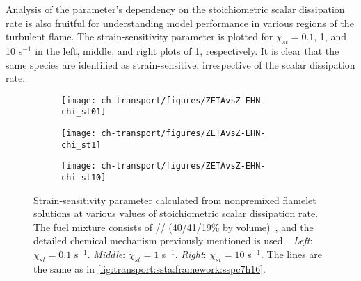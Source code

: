 Analysis of the parameter's dependency on the stoichiometric scalar dissipation rate is also fruitful for understanding model performance in various regions of the turbulent flame. The strain-sensitivity parameter is plotted for $\chi_{st} = 0.1$, 1, and 10 s$^{-1}$ in the left, middle, and right plots of \cref{fig:transport:ssta:dependencies:chist}, respectively. It is clear that the same species are identified as strain-sensitive, irrespective of the scalar dissipation rate.


\begin{figure}[ht]
  \centering
  \begin{subfigure}[b]{0.33\linewidth}
    \texttt{[image: ch-transport/figures/ZETAvsZ-EHN-chi\_st01]}
  \end{subfigure}%
  \begin{subfigure}[b]{0.33\linewidth}
    \texttt{[image: ch-transport/figures/ZETAvsZ-EHN-chi\_st1]}
  \end{subfigure}%
  \begin{subfigure}[b]{0.33\linewidth}
    \texttt{[image: ch-transport/figures/ZETAvsZ-EHN-chi\_st10]}
  \end{subfigure}
  \caption[Dependency of Strain-Sensitivity Parameter \texorpdfstring{$\zeta_k$}{Zk} on \texorpdfstring{$\chi_{st}$}{Xst}]{Strain-sensitivity parameter calculated from nonpremixed flamelet solutions at various values of stoichiometric scalar dissipation rate. The fuel mixture consists of // (40/41/19\% by volume)~\cite{mahmoud2017}, and the detailed chemical mechanism previously mentioned is used~\cite{blanquart2009588,narayanaswamy2010}. \textit{Left}: $\chi_{st} = 0.1$ s$^{-1}$. \textit{Middle}: $\chi_{st} = 1$ s$^{-1}$. \textit{Right}: $\chi_{st} = 10$ s$^{-1}$. The lines are the same as in \cref{fig:transport:ssta:framework:sspc7h16}.}
  \label{fig:transport:ssta:dependencies:chist}
\end{figure}

